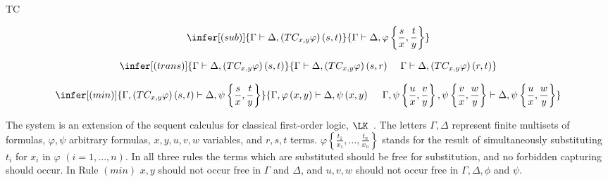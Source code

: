 \begin{entry}{TC}  



\begin{calculus}

\[
\infer[(sub)]{\Gamma\vdash\Delta,\left(TC_{x,y}\varphi\right)\left(s,t\right)}{\Gamma\vdash\Delta,\varphi\left\{ \frac{s}{x},\frac{t}{y}\right\} }
\]

\[
\infer[(trans)]{\Gamma\vdash\Delta,\left(TC_{x,y}\varphi\right)\left(s,t\right)}{\Gamma\vdash\Delta,\left(TC_{x,y}\varphi\right)\left(s,r\right)\,\,\,\,\,\,\,\Gamma\vdash\Delta,\left(TC_{x,y}\varphi\right)\left(r,t\right)}
\]

\[
\infer[(min)]{\Gamma,\left(TC_{x,y}\varphi\right)\left(s,t\right)\vdash\Delta,\psi\left\{ \frac{s}{x},\frac{t}{y}\right\} }{\Gamma,\varphi\left(x,y\right)\vdash\Delta,\psi\left(x,y\right)\,\,\,\,\,\,\,\,\Gamma,\psi\left\{ \frac{u}{x},\frac{v}{y}\right\} ,\psi\left\{ \frac{v}{x},\frac{w}{y}\right\} \vdash\Delta,\psi\left\{ \frac{u}{x},\frac{w}{y}\right\} }
\]


\end{calculus}


 \begin{clarifications}
The system is an extension of the sequent calculus for classical first-order logic, $\LK$~. The letters $\Gamma,\Delta$ represent finite multisets of formulas, $\varphi,\psi$ arbitrary formulas, $x,y,u,v,w$ variables, and $r,s,t$ terms. $\varphi\left\{ \frac{t_{1}}{x_{1}},...,\frac{t_{n}}{x_{n}}\right\} $ stands for the result of simultaneously substituting $t_{i}$ for $x_{i}$ in $\varphi$ $(i=1,...,n)$. In all three rules the terms which are substituted should be free for substitution, and no forbidden capturing should occur. In Rule $(min)$ $x,y$ should not occur free in $\Gamma$ and $\Delta$, and $u,v,w$ should not occur free in $\Gamma,\Delta,\phi$ and $\psi$.
 \end{clarifications}


\end{entry}

